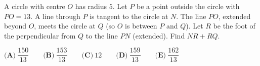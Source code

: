 A circle with centre $O$ has radius $5$. Let $P$ be a point outside the circle with $PO=13$. A line through $P$ is tangent to the circle at $N$. The line $PO$, extended beyond $O$, meets the circle at $Q$ (so $O$ is between $P$ and $Q$). Let $R$ be the foot of the perpendicular from $Q$ to the line $PN$ (extended). Find $NR+RQ$.

$\textbf{(A)}\ \dfrac{150}{13}\qquad\textbf{(B)}\ \dfrac{153}{13}\qquad\textbf{(C)}\ 12\qquad\textbf{(D)}\ \dfrac{159}{13}\qquad\textbf{(E)}\ \dfrac{162}{13}$
